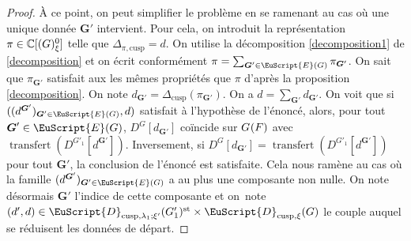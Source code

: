 \documentclass[JEP,XML,SOM,Unicode,francais]{cedram}
\let\mathcal \EuScript
\newcommand{\NoChangel}[1]{%
\expandafter\let\csname old\string#1\endcsname=#1
\let#1=\relax
\newcommand{#1}{\mathcode`l="716C\csname old\string#1\endcsname\mathcode`l="7160 }%
}
\newcommand{\cusp}{\mathrm{cusp}}
\newcommand{\rell}{\mathrm{ell}} \NoChangel{\rell}
\newcommand{\Ell}{\mathrm{Ell}} \NoChangel{\Ell}
\newcommand{\st}{\mathrm{st}}
\DeclareMathOperator{\transfert}{transfert}
\newcommand{\bG}{\boldsymbol{G}}
\newcommand{\cD}{\mathcal{D}}
\newcommand{\cE}{\mathcal{E}}
\newcommand{\CC}{\mathbb{C}}
\theoremstyle{plain}
\theoremstyle{definition}
\begin{document}
\begin{proof}
À ce point, on peut simplifier le problème en se ramenant au cas où une unique donnée $\bG'$ intervient. Pour cela, on introduit la représentation $\pi\in \CC[\Ell(G)_{\xi}^0]$ telle que $\Delta_{\pi,\cusp}=d$. On utilise la décomposition \eqref{decomposition1} de \ref{decomposition} et on écrit conformément $\pi=\sum_{\bG'\in \cE(G)}\pi_{\bG'}$. On sait que $\pi_{\bG'}$ satisfait aux les mêmes propriétés que $\pi$ d'après la proposition \ref{decomposition}. On note $d_{\bG'}=\Delta_{\cusp}(\pi_{\bG'})$. On a $d=\sum_{\bG'}d_{\bG'}$. On voit que si $((d^{\bG'})_{\bG'\in \cE(G)},d)$ satisfait à l'hypothèse de l'énoncé, alors, pour tout $\bG'\in \cE(G)$, $D^G[d_{\bG'}]$ coïncide sur $G_{\rell}(F)$ avec $\transfert(D^{G'_{1}}[d^{\bG'}])$. Inversement, si $D^G[d_{\bG'}]=\transfert(D^{G'_{1}}[d^{\bG'}])$ pour tout $\bG'$, la conclusion de l'énoncé est satisfaite. Cela nous ramène au cas où la famille $(d^{\bG'})_{\bG'\in \cE(G)}$ a au plus une composante non nulle. On note désormais $\bG'$ l'indice de cette composante et on~note $(d',d)\in \cD_{\cusp,\lambda_{1};\xi'}(G'_{1})^{\st}\times \cD_{\cusp,\xi}(G)$ le couple auquel se réduisent les données de départ.


\end{proof}
\end{document}
